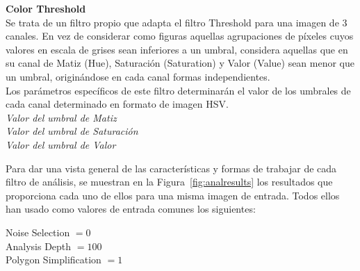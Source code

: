 	\noindent\textbf{Color Threshold}\\

		Se trata de un filtro propio que adapta el filtro Threshold para una imagen de 3 canales. En vez de considerar como figuras aquellas agrupaciones de píxeles cuyos valores en escala de grises sean inferiores a un umbral, considera aquellas que en su canal de Matiz (Hue), Saturación (Saturation) y Valor (Value) sean menor que un umbral, originándose en cada canal formas independientes.\\
		
		Los parámetros específicos de este filtro determinarán el valor de los umbrales de cada canal determinado en formato de imagen HSV.\\		
		
		\noindent\textit{Valor del umbral de Matiz}\\
		\noindent\textit{Valor del umbral de Saturación}\\
		\noindent\textit{Valor del umbral de Valor}

		
		
		\vspace{0.5in}Para dar una vista general de las características y formas de trabajar de cada filtro de análisis, se muestran en la Figura~\ref{fig:analresults} los resultados que proporciona cada uno de ellos para una misma imagen de entrada. Todos ellos han usado como valores de entrada comunes los siguientes:

		
		\begin{center}
			Noise Selection $= 0$\\
			Analysis Depth $= 100$\\
			Polygon Simplification $= 1$\\
		\end{center}
		
